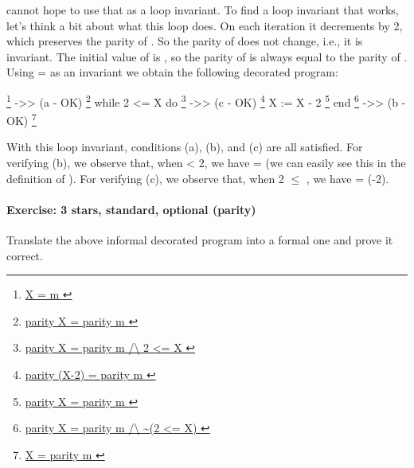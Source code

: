 \documentclass[12pt]{report}
\begin{document}
    cannot hope to use that as a loop invariant.  To find a loop invariant
    that works, let's think a bit about what this loop does.  On each
    iteration it decrements  by 2, which preserves the parity of .
    So the parity of  does not change, i.e., it is invariant.  The initial
    value of  is , so the parity of  is always equal to the
    parity of . Using   =   as an invariant we
    obtain the following decorated program:


      \footnote{\url{ X = m }} ->>                                         (a - OK)
      \footnote{\url{ parity X = parity m }}
        while 2 <= X do
                     \footnote{\url{ parity X = parity m /\ 2 <= X }} ->>  (c - OK)
                     \footnote{\url{ parity (X-2) = parity m }}
          X := X - 2
                     \footnote{\url{ parity X = parity m }}
        end
      \footnote{\url{ parity X = parity m /\ ~(2 <= X) }} ->>              (b - OK)
      \footnote{\url{ X = parity m }}


    With this loop invariant, conditions (a), (b), and (c) are all
    satisfied. For verifying (b), we observe that, when  < 2, we
    have   =  (we can easily see this in the definition of
    ).  For verifying (c), we observe that, when 2 \ensuremath{\le} , we
    have   =  (-2). 

\paragraph{Exercise: 3 stars, standard, optional (parity)}




    Translate the above informal decorated program into a formal one
    and prove it correct.
\end{document}
